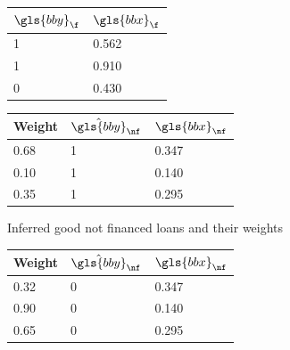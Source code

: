 \begin{table}
\caption{\label{fuzzyexample} Example of implementation of the Fuzzy Augmentation method on a small dataset}
{\setlength{\parindent}{0cm}
\begin{multicols}{4}
\small

\begin{subfigure}[t]{0.22\textwidth}
\begin{center}
\begin{adjustbox}{max width=0.95\textwidth}
\begin{tabular}{l l}
\toprule
\textbf{${\gls{bby}}_{\f}$} & \textbf{${\gls{bbx}}_{\f}$}\\
\midrule
1 & 0.562 \\
1 & 0.910 \\
0 & 0.430 \\
\bottomrule
\end{tabular}
\end{adjustbox}
\end{center}

\label{fuzzy:sfig1}
\end{subfigure}

\columnbreak

\begin{subfigure}[t]{0.22\textwidth}
\begin{center}
\begin{adjustbox}{max width=0.95\textwidth}
\begin{tabular}{l l l}
\toprule
\textbf{Weight} & \textbf{$\hat{\gls{bby}}_{\nf}$} & \textbf{${\gls{bbx}}_{\nf}$}\\
\midrule
0.68 & 1 & 0.347 \\
0.10 & 1 & 0.140 \\
0.35 & 1 & 0.295 \\
\bottomrule
\end{tabular}
\end{adjustbox}
\end{center}

\caption{Inferred good not financed loans and their weights}
\label{fuzzy:sfig2}
\end{subfigure}

\columnbreak

\begin{subfigure}[t]{0.22\textwidth}
\begin{center}
\begin{adjustbox}{max width=0.95\textwidth}
\begin{tabular}{l l l}
\toprule
\textbf{Weight} & \textbf{$\hat{\gls{bby}}_{\nf}$} & \textbf{${\gls{bbx}}_{\nf}$}\\
\midrule
0.32 & 0 & 0.347 \\
0.90 & 0 & 0.140 \\
0.65 & 0 & 0.295 \\
\bottomrule
\end{tabular}
\end{adjustbox}
\end{center}


\end{subfigure}
\end{multicols}}
\end{table}
